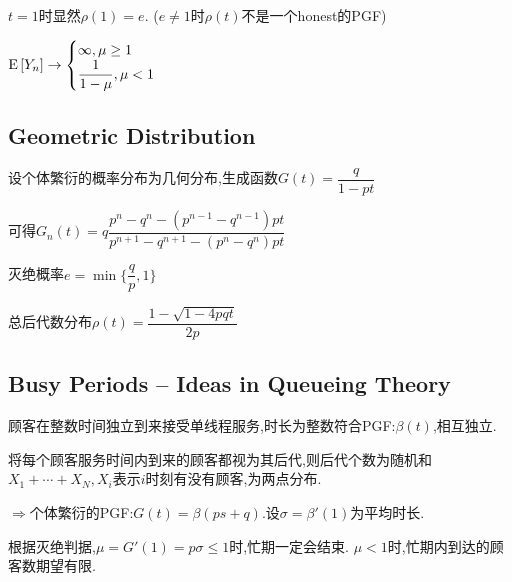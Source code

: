 $ t = 1时显然\rho(1) = e.$ ($ e \ne 1$时$ \rho(t)$不是一个honest的PGF)

$\text{E}\left[Y_n\right] \to \begin{cases}\infty, \mu \ge  1\\\dfrac{1}{1-\mu}, \mu < 1\end{cases} $

\subsection{Geometric Distribution}
设个体繁衍的概率分布为几何分布,生成函数$ G(t) = \dfrac{q}{1-pt}$

可得$ G_n(t) = q\dfrac{p^n-q^n - (p^{n-1}-q^{n-1})pt}{p^{n+1}-q^{n+1}-(p^n-q^n)pt}$

灭绝概率$ e = \min\{\dfrac{q}{p},1\}$

总后代数分布$ \rho(t) = \dfrac{1-\sqrt{1-4pqt}}{2p}$

\subsection{Busy Periods -- Ideas in Queueing Theory}
顾客在整数时间独立到来接受单线程服务,时长为整数符合PGF:$ \beta(t)$,相互独立.

将每个顾客服务时间内到来的顾客都视为其后代,则后代个数为随机和$ X_1 + \cdots +X_N, X_i $表示$ i$时刻有没有顾客,为两点分布.

$ \Rightarrow $个体繁衍的PGF:$ G(t)= \beta(ps + q). $设$ \sigma = \beta'(1)$为平均时长.

根据灭绝判据,$ \mu = G'(1) = p\sigma \le 1$时,忙期一定会结束. $ \mu < 1$时,忙期内到达的顾客数期望有限.
